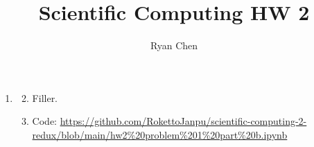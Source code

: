 \documentclass{article}
\title{Scientific Computing HW 2}
\author{Ryan Chen}
\begin{document}
	
\maketitle



\begin{enumerate}
	
	
	
\item

\begin{enumerate}[label=(\alph*)]\setcounter{enumi}{1}
	
	\item Filler.
	
	\item Code: \url{https://github.com/RokettoJanpu/scientific-computing-2-redux/blob/main/hw2%20problem%201%20part%20b.ipynb}
	

\end{enumerate}
\end{enumerate}
\end{document}
